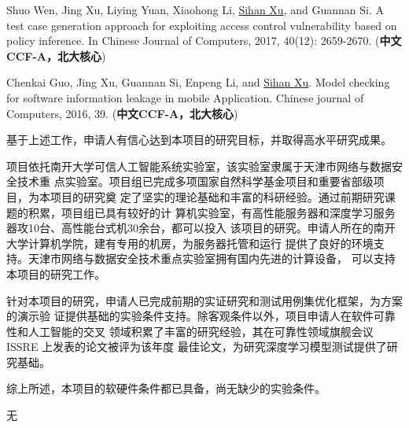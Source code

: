 \documentclass[a4paper,zihao=-4]{article}
\begin{document}
\begin{enumerate}[label={[\arabic*]}]
	\item Shuo Wen, Jing Xu, Liying Yuan, Xiaohong Li, \underline{Sihan Xu}, and
	      Guannan Si. A test case generation approach for exploiting access control
	      vulnerability based on policy inference. In Chinese Journal of Computers,
	      2017, 40(12): 2659-2670. (\textbf{中文CCF-A，北大核心})

	\item Chenkai Guo, Jing Xu, Guannan Si, Enpeng Li, and \underline{Sihan Xu}. Model
	      checking for software information leakage in mobile Application.
	      Chinese journal of Computers, 2016, 39. (\textbf{中文CCF-A，北大核心})


\end{enumerate}


基于上述工作，申请人有信心达到本项目的研究目标，并取得高水平研究成果。


项目依托南开大学可信人工智能系统实验室，该实验室隶属于天津市网络与数据安全技术重
点实验室。项目组已完成多项国家自然科学基金项目和重要省部级项目，为本项目的研究奠
定了坚实的理论基础和丰富的科研经验。通过前期研究课题的积累，项目组已具有较好的计
算机实验室，有高性能服务器和深度学习服务器攻10台、高性能台式机30余台，都可以投入
该项目的研究。申请人所在的南开大学计算机学院，建有专用的机房，为服务器托管和运行
提供了良好的环境支持。天津市网络与数据安全技术重点实验室拥有国内先进的计算设备，
可以支持本项目的研究工作。

针对本项目的研究，申请人已完成前期的实证研究和测试用例集优化框架，为方案的演示验
证提供基础的实验条件支持。除客观条件以外，项目申请人在软件可靠性和人工智能的交叉
领域积累了丰富的研究经验，其在可靠性领域旗舰会议 ISSRE 上发表的论文被评为该年度
最佳论文，为研究深度学习模型测试提供了研究基础。

综上所述，本项目的软硬件条件都已具备，尚无缺少的实验条件。


无

\end{document}
